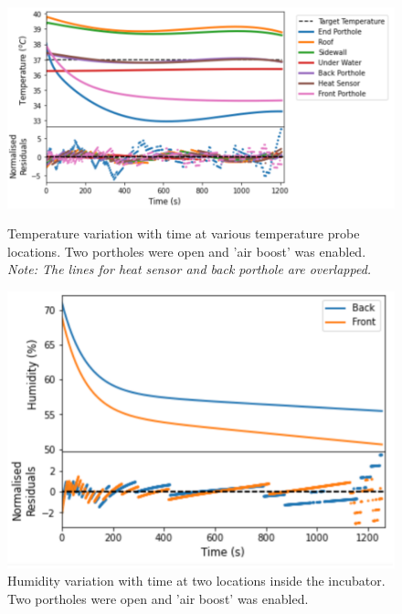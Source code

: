 \documentclass{article}
\begin{document}
\begin{figure}[H]
\centering
\begin{minipage}{.57\linewidth}
    \captionsetup{justification=centering,margin=0.5cm}
    \includegraphics[width=\textwidth]{Two holes air boost.png}
    \caption{Temperature variation with time at various temperature probe locations. Two portholes were open and 'air boost’ was enabled. \textit{Note: The lines for heat sensor and back porthole are overlapped.}}
\end{minipage}
\hfill
\begin{minipage}{.42\linewidth}
    \captionsetup{justification=centering,margin=0.3cm}
    \includegraphics[width=\textwidth]{two door humidity air boost.png}
    \caption{Humidity variation with time at two locations inside the incubator. Two portholes were open and 'air boost' was enabled.}
    \end{minipage}
\end{figure}
\end{document}
